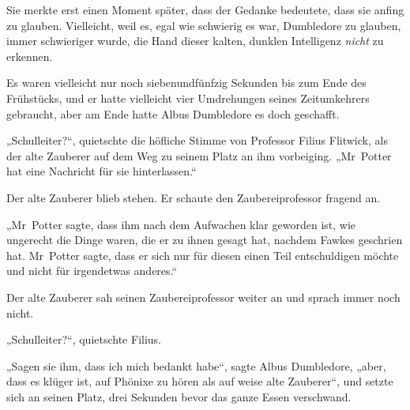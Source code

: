 Sie merkte erst einen Moment später, dass der Gedanke bedeutete, dass sie anfing zu glauben. Vielleicht, weil es, egal wie schwierig es war, Dumbledore zu glauben, immer schwieriger wurde, die Hand dieser kalten, dunklen Intelligenz \emph{nicht} zu erkennen.


Es waren vielleicht nur noch siebenundfünfzig Sekunden bis zum Ende des Frühstücks, und er hatte vielleicht vier Umdrehungen seines Zeitumkehrers gebraucht, aber am Ende hatte Albus Dumbledore es doch geschafft.

„Schulleiter?“, quietschte die höfliche Stimme von Professor Filius Flitwick, als der alte Zauberer auf dem Weg zu seinem Platz an ihm vorbeiging.
„Mr~Potter hat eine Nachricht für sie hinterlassen.“

Der alte Zauberer blieb stehen. Er schaute den Zaubereiprofessor fragend an.

„Mr~Potter sagte, dass ihm nach dem Aufwachen klar geworden ist, wie ungerecht die Dinge waren, die er zu ihnen gesagt hat, nachdem Fawkes geschrien hat. Mr~Potter sagte, dass er sich nur für diesen einen Teil entschuldigen möchte und nicht für irgendetwas anderes.“

Der alte Zauberer sah seinen Zaubereiprofessor weiter an und sprach immer noch nicht.

„Schulleiter?“, quietschte Filius.

„Sagen sie ihm, dass ich mich bedankt habe“, sagte Albus Dumbledore, „aber, dass es klüger ist, auf Phönixe zu hören als auf weise alte Zauberer“, und setzte sich an seinen Platz, drei Sekunden bevor das ganze Essen verschwand.

